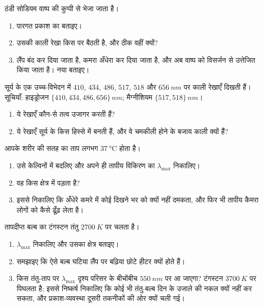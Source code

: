 \begin{exercise}[$\star\star$]\label{exo:g10:light-spectra:9}
 ठंडी सोडियम वाष्प की कुप्पी से भेजा जाता है।
\begin{enumerate}
  \item पारगत प्रकाश का  बताइए।
  \item उसकी काली रेखा किस  पर बैठती है, और ठीक
        वहीं क्यों?
  \item लैंप बंद कर दिया जाता है, कमरा अँधेरा कर दिया जाता है, और अब
        वाष्प को विसर्जन से उत्तेजित किया जाता है। नया
         बताइए।
\end{enumerate}
\end{exercise}

\begin{exercise}[$\star\star$]\label{exo:g10:light-spectra:10}
सूर्य के एक उच्च-विभेदन  में $410$, $434$, $486$,
$517$, $518$ और $\qty{656}{nm}$ पर काली रेखाएँ दिखती हैं। सूचियाँ:
हाइड्रोजन $\{410, 434, 486, 656\}\,\unit{nm}$; मैग्नीशियम $\{517, 518\}\,\unit{nm}$।
\begin{enumerate}
  \item ये रेखाएँ कौन-से तत्व उजागर करती हैं?
  \item ये रेखाएँ सूर्य के किस हिस्से में बनती हैं, और वे चमकीली होने
        के बजाय काली क्यों हैं?
\end{enumerate}
\end{exercise}

\begin{exercise}[$\star\star$]\label{exo:g10:light-spectra:11}
आपके शरीर की सतह का ताप लगभग $\qty{37}{\degreeCelsius}$ होता है।
\begin{enumerate}
  \item उसे केल्विनों में बदलिए और अपने ही तापीय विकिरण का
        $\lambda_{\max}$ निकालिए।
  \item वह किस क्षेत्र में पड़ता है?
  \item इससे निकालिए कि अँधेरे कमरे में कोई दिखने भर को क्यों नहीं
        दमकता, और फिर भी तापीय कैमरा लोगों को कैसे ढूँढ़ लेता है।
\end{enumerate}
\end{exercise}

\begin{exercise}[$\star\star\star$]\label{exo:g10:light-spectra:12}
तापदीप्त बल्ब का टंगस्टन तंतु $\qty{2700}{K}$ पर चलता है।
\begin{enumerate}
  \item $\lambda_{\max}$ निकालिए और उसका क्षेत्र बताइए।
  \item समझाइए कि ऐसे बल्ब घटिया लैंप पर बढ़िया छोटे हीटर क्यों होते
        हैं।
  \item किस तंतु-ताप पर $\lambda_{\max}$ दृश्य परिसर के बीचोंबीच $\qty{550}{nm}$ पर आ
        जाएगा? टंगस्टन $\qty{3700}{K}$ पर पिघलता है; इससे निष्कर्ष निकालिए कि
        कोई भी तंतु-बल्ब दिन के उजाले की नकल क्यों नहीं कर सकता, और
        प्रकाश-व्यवस्था दूसरी तकनीकों की ओर क्यों चली गई।
\end{enumerate}
\end{exercise}

